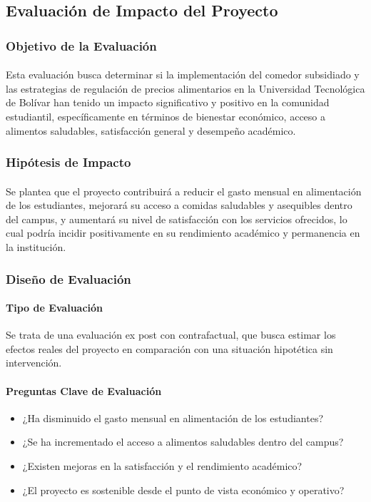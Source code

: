 \documentclass[letterpaper, 11pt]{report}
\begin{document}
\subsection{Evaluación de Impacto del Proyecto}

\subsubsection{Objetivo de la Evaluación}
\paragraph{}
Esta evaluación busca determinar si la implementación del comedor subsidiado y las estrategias de regulación de precios alimentarios en la Universidad Tecnológica de Bolívar han tenido un impacto significativo y positivo en la comunidad estudiantil, específicamente en términos de bienestar económico, acceso a alimentos saludables, satisfacción general y desempeño académico.

\subsubsection{Hipótesis de Impacto}
\paragraph{}
Se plantea que el proyecto contribuirá a reducir el gasto mensual en alimentación de los estudiantes, mejorará su acceso a comidas saludables y asequibles dentro del campus, y aumentará su nivel de satisfacción con los servicios ofrecidos, lo cual podría incidir positivamente en su rendimiento académico y permanencia en la institución.

\subsubsection{Diseño de Evaluación}
\paragraph{Tipo de Evaluación}
Se trata de una evaluación ex post con contrafactual, que busca estimar los efectos reales del proyecto en comparación con una situación hipotética sin intervención.

\paragraph{Preguntas Clave de Evaluación}
\begin{itemize}
      \item ¿Ha disminuido el gasto mensual en alimentación de los estudiantes?
      \item ¿Se ha incrementado el acceso a alimentos saludables dentro del campus?
      \item ¿Existen mejoras en la satisfacción y el rendimiento académico?
      \item ¿El proyecto es sostenible desde el punto de vista económico y operativo?
\end{itemize}
\end{document}
